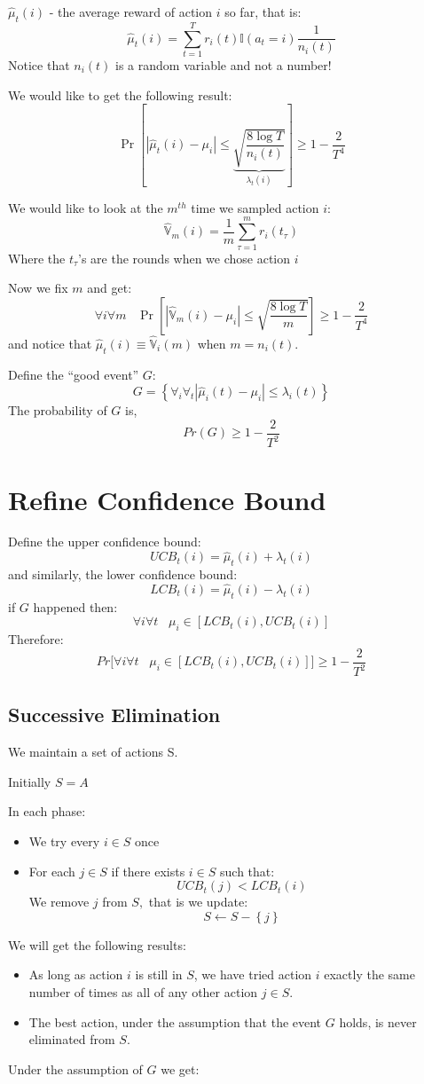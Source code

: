 $\hat{\mu}_{t}(i)$ - the average reward of action $i$ so far, that
is:
\[
\hat{\mu}_{t}(i)={\displaystyle
\sum_{t=1}^{T}r_{i}(t)}\mathbb{I}\left(a_{t}=i\right)\frac{1}{n_{i}(t)}
\]
Notice that $n_{i}(t)$ is a random variable and not a number!

We would like to get the following result:
\[
\Pr\left[\left|\hat{\mu}_{t}(i)-\mu_{i}\right|\le\underbrace{\sqrt{\frac{8\log
T}{n_{i}(t)}}}_{\lambda_{t}(i)}\right]\ge1-\frac{2}{T^{4}}
\]

We would like to look at the $m^{th}$ time we sampled action $i$:
\[
\hat{\mathbb{V}}_{m}(i)=\frac{1}{m} \sum_{\tau=1}^{m}r_{i}(t_{\tau})
\]
Where the $t_{\tau}$'s are the rounds when we chose action $i$

Now we fix $m$ and get:
\[
\forall{i}\forall{m}\;\;\;
\Pr\left[\left|\hat{\mathbb{V}}_{m}(i)-\mu_{i}\right|\le\sqrt{\frac{8\log
T}{m}}\right]\ge1-\frac{2}{T^{4}}
\]
and notice that $\hat{\mu}_{t}(i)\equiv\hat{\mathbb{V}}_{i}(m)$ when
$m=n_{i}(t)$.

Define the ``good event'' $G$:
\[
G=\left\{ \forall_{i}\forall_{t}\left|\hat{\mu}_{i}(t)-\mu_{i}\right|\le\lambda_{i}(t)\right\}
\]
The probability of $G$ is,
\[
Pr\left(G\right)\ge1-\frac{2}{T^{2}}
\]

\section{Refine Confidence Bound}

Define the upper confidence bound:
\[
UCB_{t}(i)=\hat{\mu}_{t}(i)+\lambda_{t}(i)
\]
and similarly, the lower confidence bound:
\[
LCB_{t}(i)=\hat{\mu}_{t}(i)-\lambda_{t}(i)
\]
if $G$ happened then:
\[
\forall{i}\forall{t}\;\;\;\mu_{i}\in\left[LCB_{t}(i),UCB_{t}(i)\right]
\]
Therefore:
\[
Pr\biggl[\forall{i}\forall{t}\;\;\;
\mu_{i}\in\left[LCB_{t}(i),UCB_{t}(i)\right]\biggr]\ge1-\frac{2}{T^{2}}
\]

\subsection{Successive Elimination}

We maintain a set of actions S.

Initially $S=A$

In each phase:
\begin{itemize}
\item We try every $i\in S$ once
\item For each $j\in S$ if there exists $i\in S$ such that:
\[
UCB_{t}(j)<LCB_{t}(i)
\]
 We remove $j$ from $S,$ that is we update:
\[
S\leftarrow S-\left\{ j\right\}
\]
\end{itemize}
We will get the following results:
\begin{itemize}
\item As long as action $i$ is still in $S$, we have tried action $i$ exactly the
same number of times as all of any other action $j\in S$.
\item The best action, under the assumption that the event $G$ holds, is never eliminated
from $S$.
\end{itemize}
Under the assumption of $G$ we get:

